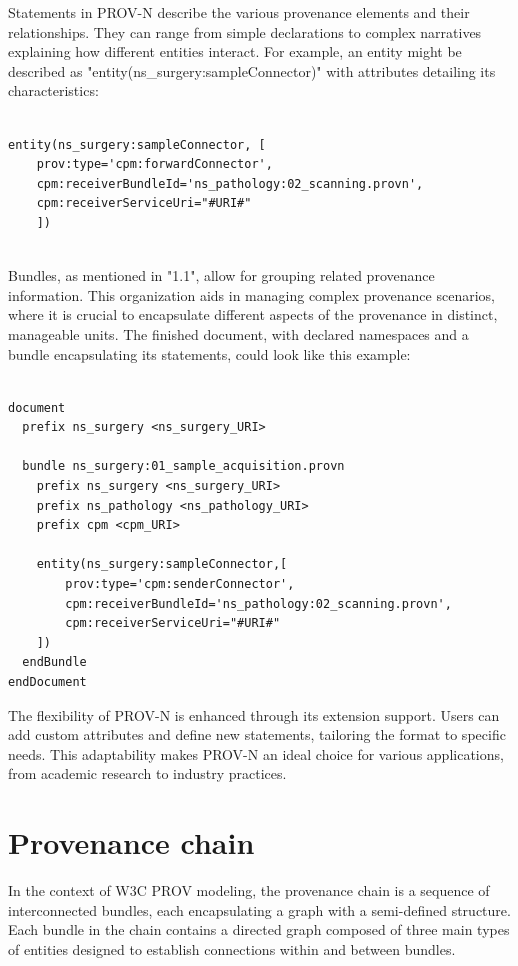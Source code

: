 \documentclass[
  digital,     %
  oneside,     %
  nosansbold,  %
  nocolorbold, %
  lof,         %
  lot,         %
]{fithesis4}
\begin{document}
Statements in PROV-N describe the various provenance elements and their relationships. They can range from simple declarations to complex narratives explaining how different entities interact. For example, an entity might be described as "entity(ns\_surgery:sampleConnector)" with attributes detailing its characteristics:

\begin{verbatim}

entity(ns_surgery:sampleConnector, [
    prov:type='cpm:forwardConnector', 
    cpm:receiverBundleId='ns_pathology:02_scanning.provn', 
    cpm:receiverServiceUri="#URI#"
    ])
    
\end{verbatim}

Bundles, as mentioned in "1.1", allow for grouping related provenance information. This organization aids in managing complex provenance scenarios, where it is crucial to encapsulate different aspects of the provenance in distinct, manageable units. The finished document, with declared namespaces and a bundle encapsulating its statements, could look like this example:

\begin{verbatim}

document
  prefix ns_surgery <ns_surgery_URI>

  bundle ns_surgery:01_sample_acquisition.provn
    prefix ns_surgery <ns_surgery_URI>
    prefix ns_pathology <ns_pathology_URI>
    prefix cpm <cpm_URI>

    entity(ns_surgery:sampleConnector,[
        prov:type='cpm:senderConnector',
        cpm:receiverBundleId='ns_pathology:02_scanning.provn',
        cpm:receiverServiceUri="#URI#"
    ])
  endBundle
endDocument

\end{verbatim}

The flexibility of PROV-N is enhanced through its extension support. Users can add custom attributes and define new statements, tailoring the format to specific needs. This adaptability makes PROV-N an ideal choice for various applications, from academic research to industry practices.
\shorthandon{-}

\section{Provenance chain}
\shorthandoff{-}
In the context of W3C PROV modeling, the provenance chain is a sequence of interconnected bundles, each encapsulating a graph with a semi-defined structure. Each bundle in the chain contains a directed graph composed of three main types of entities designed to establish connections within and between bundles.
\end{document}
